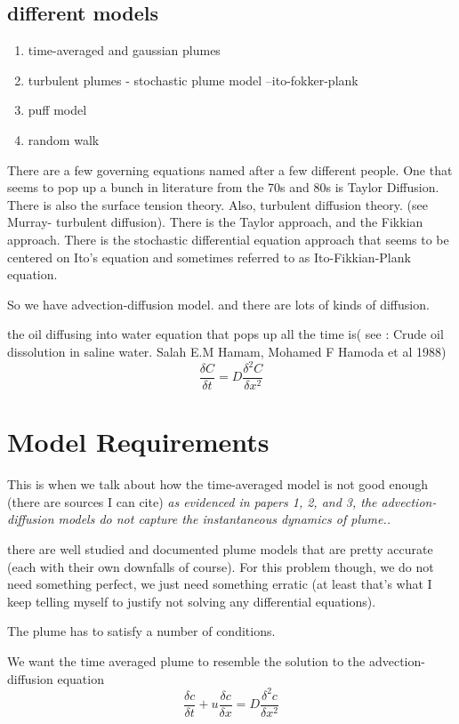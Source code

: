 \documentclass[11pt]{article} %
\begin{document}
\subsection{different models}
\begin{enumerate}
	\item time-averaged and gaussian plumes
	\item turbulent plumes - stochastic plume model --ito-fokker-plank
	\item puff model
	\item random walk
\end{enumerate}
		
There are a few governing equations named after a few different people.  One that seems to pop up a bunch in literature from the 70s and 80s is Taylor Diffusion.  There is also the surface tension theory.  Also, turbulent diffusion theory.  (see Murray- turbulent diffusion).  
There is the Taylor approach, and the Fikkian approach.  There is the stochastic differential equation approach that seems to be centered on Ito's equation and sometimes referred to as Ito-Fikkian-Plank equation.  

So we have advection-diffusion model.  and there are lots of kinds of diffusion.  

the oil diffusing into water equation that pops up all the time is( see : Crude oil dissolution in saline water.  Salah E.M Hamam, Mohamed F  Hamoda et al  1988)
$$
\frac{\delta C}{\delta t} = D \frac{ \delta^2 C}{\delta x^2}
$$


\section{Model Requirements}

This is when we talk about how the time-averaged model is not good enough (there are sources I can cite) {\it  as evidenced in papers 1, 2, and 3, the advection-diffusion models do not capture the instantaneous dynamics of plume..}


there are well studied and documented plume models that are pretty accurate (each with their own downfalls of course).  For this problem though, we do not need something perfect, we just need something erratic (at least that's what I keep telling myself to justify not solving any differential equations).  

The plume has to satisfy a number of conditions.  


We want the time averaged plume to resemble the solution to the advection-diffusion equation
$$ 
\frac{\delta c}{\delta t} + u \frac{\delta c}{\delta x} = D \frac{\delta^2 c}{\delta x^2}
$$
\end{document}
